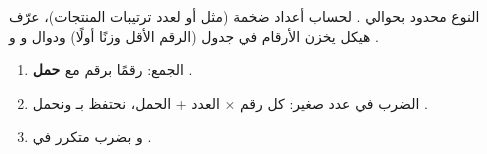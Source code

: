 \begin{statement}
النوع  محدود بحوالي . لحساب أعداد ضخمة (مثل  أو  لعدد ترتيبات المنتجات)، عرّف هيكل  يخزن الأرقام في جدول (الرقم الأقل وزنًا أولًا) ودوال  و  و .
\end{statement}
\begin{stepsbox}\begin{enumerate}
\item الجمع: رقمًا برقم مع \textbf{حمل} .
\item الضرب في عدد صغير: كل رقم × العدد + الحمل، نحتفظ بـ  ونحمل .
\item {} و  بضرب متكرر في .
\end{enumerate}\end{stepsbox}
